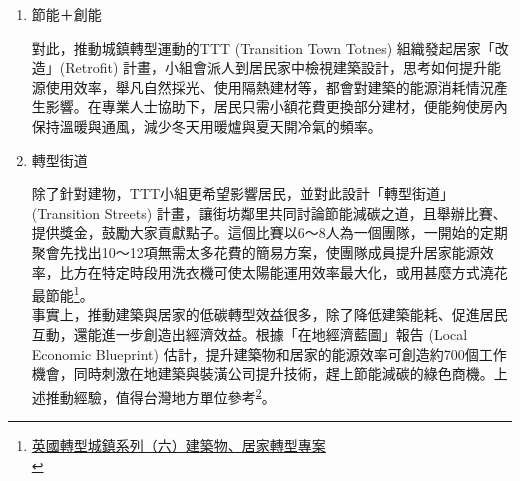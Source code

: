 \documentclass[a4paper,12pt]{article}
\begin{document}
\begin{enumerate}
\begin{enumerate}
為提升城鎮經濟的韌性，TTT (Transition Town Totnes) 組織開始推動境內使用的在地貨幣，確保經濟能量在內部不斷循環。TT發行的「托特尼斯鎊」(Totnes Pound) 分為：1鎊、5鎊、10鎊、21鎊等四種面額，並朝向電子化，消費者可用手機開戶，透過網路兌現、並進行交易。許多人好奇為何是「21鎊」的面額；而非「20鎊」？轉型運動發起者Rob Hopkins幽默地說，「這種設計就是希望托特尼斯的貨幣與眾不同！」\\

由於在地貨幣無法在其他城鎮使用，因此TTT組織會努力行銷，鼓勵觀光客下次再回來消費，才能把沒用完的托特尼斯鎊花光，替地方增加回頭客。從環境角度審視的效益也不錯，因加入在地貨幣的商家多屬餐飲服務類，採購食材和物料會用在地貨幣向附近的供應商採買，藉此大為縮短了食物運輸里程\footnote{\href{https://lowestc.blogspot.com/2017/02/blog-post\_69.html}{英國轉型城鎮系列（四）城鎮韌性專案之「在地貨幣」}\\}。\\
\item 節能＋創能
\label{sec:org8252c19}

對此，推動城鎮轉型運動的TTT (Transition Town Totnes) 組織發起居家「改造」(Retrofit) 計畫，小組會派人到居民家中檢視建築設計，思考如何提升能源使用效率，舉凡自然採光、使用隔熱建材等，都會對建築的能源消耗情況產生影響。在專業人士協助下，居民只需小額花費更換部分建材，便能夠使房內保持溫暖與通風，減少冬天用暖爐與夏天開冷氣的頻率。\\
\item 轉型街道
\label{sec:org058d1e7}

除了針對建物，TTT小組更希望影響居民，並對此設計「轉型街道」 (Transition Streets) 計畫，讓街坊鄰里共同討論節能減碳之道，且舉辦比賽、提供獎金，鼓勵大家貢獻點子。這個比賽以6～8人為一個團隊，一開始的定期聚會先找出10～12項無需太多花費的簡易方案，使團隊成員提升居家能源效率，比方在特定時段用洗衣機可使太陽能運用效率最大化，或用甚麼方式澆花最節能\footnote{\href{https://lowestc.blogspot.com/2017/07/blog-post\_17.html}{英國轉型城鎮系列（六）建築物、居家轉型專案 }\\\label{org92c9b15}}。\\

事實上，推動建築與居家的低碳轉型效益很多，除了降低建築能耗、促進居民互動，還能進一步創造出經濟效益。根據「在地經濟藍圖」報告 (Local Economic Blueprint) 估計，提升建築物和居家的能源效率可創造約700個工作機會，同時刺激在地建築與裝潢公司提升技術，趕上節能減碳的綠色商機。上述推動經驗，值得台灣地方單位參考\textsuperscript{\ref{org92c9b15}}。\\
\end{enumerate}


\end{enumerate}
\end{document}
